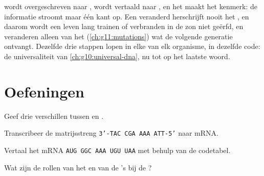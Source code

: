 \begin{remark}\label{rem:g11:gene-expression:flow}
 wordt overgeschreven naar ,  wordt vertaald naar , en het
 maakt het kenmerk: de informatie stroomt maar één kant op. Een
veranderd  herschrijft nooit het , en daarom wordt een leven lang
trainen of verbranden in de zon niet geërfd, en veranderen alleen
 van het  (\cref{ch:g11:mutations}) wat de volgende generatie
ontvangt. Dezelfde drie stappen lopen in elke  van elk organisme, in
dezelfde code: de universaliteit van \cref{ch:g10:universal-dna}, nu tot
op het laatste woord.
\end{remark}

\section{Oefeningen}

\begin{exercise}[$\star$]\label{exo:g11:gene-expression:1}
Geef drie verschillen tussen  en .
\end{exercise}

\begin{exercise}[$\star$]\label{exo:g11:gene-expression:2}
Transcribeer de matrijsstreng \texttt{3'-TAC CGA AAA ATT-5'} naar mRNA.
\end{exercise}

\begin{exercise}[$\star$]\label{exo:g11:gene-expression:3}
Vertaal het mRNA \texttt{AUG GGC AAA UGU UAA} met behulp van de
codetabel.
\end{exercise}

\begin{exercise}[$\star$]\label{exo:g11:gene-expression:4}
Wat zijn de rollen van het  en van de 's bij de
?
\end{exercise}


